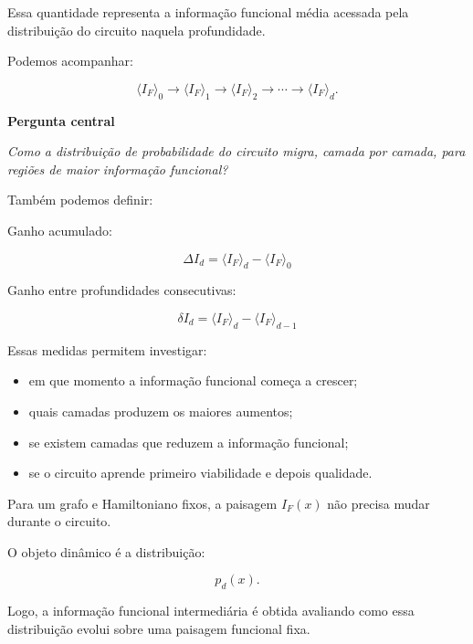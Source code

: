 \documentclass[11pt,a4paper]{article}
\begin{document}
Essa quantidade representa a informação funcional média acessada
pela distribuição do circuito naquela profundidade.

Podemos acompanhar:

\[
\langle I_F\rangle_0
\longrightarrow
\langle I_F\rangle_1
\longrightarrow
\langle I_F\rangle_2
\longrightarrow
\cdots
\longrightarrow
\langle I_F\rangle_d.
\]

\begin{center}

\textbf{Pergunta central}

\medskip

\emph{
Como a distribuição de probabilidade do circuito migra,
camada por camada, para regiões de maior informação funcional?
}

\end{center}

Também podemos definir:

\begin{definitionbox}

Ganho acumulado:

\[
\boxed{
\Delta I_d
=
\langle I_F\rangle_d
-
\langle I_F\rangle_0
}
\]

Ganho entre profundidades consecutivas:

\[
\boxed{
\delta I_d
=
\langle I_F\rangle_d
-
\langle I_F\rangle_{d-1}
}
\]

\end{definitionbox}

Essas medidas permitem investigar:

\begin{itemize}[leftmargin=1.5em]

    \item em que momento a informação funcional começa a crescer;

    \item quais camadas produzem os maiores aumentos;

    \item se existem camadas que reduzem a informação funcional;

    \item se o circuito aprende primeiro viabilidade e depois qualidade.

\end{itemize}

\begin{mainidea}

Para um grafo e Hamiltoniano fixos,
a paisagem $I_F(x)$ não precisa mudar durante o circuito.

O objeto dinâmico é a distribuição:

\[
p_d(x).
\]

Logo, a informação funcional intermediária é obtida avaliando
como essa distribuição evolui sobre uma paisagem funcional fixa.

\end{mainidea}
\end{document}
